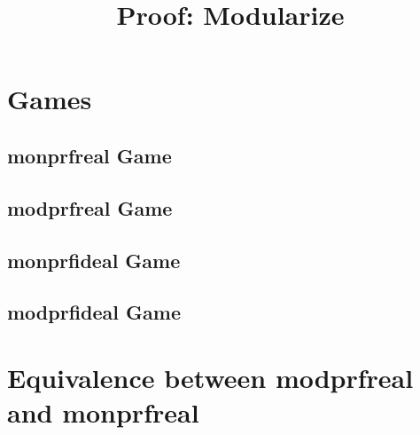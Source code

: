 \documentclass[a4paper,landscape]{article}
\title{Proof: Modularize}
\begin{document}
\maketitle
\section{Games}
\subsection{monprfreal Game}
\begin{center}

\end{center}
\begin{center}

\end{center}
\begin{center}

\end{center}
\subsection{modprfreal Game}
\begin{center}

\end{center}
\begin{center}

\end{center}
\begin{center}

\end{center}
\subsection{monprfideal Game}
\begin{center}

\end{center}
\begin{center}

\end{center}
\begin{center}

\end{center}
\subsection{modprfideal Game}
\begin{center}

\end{center}
\begin{center}

\end{center}
\begin{center}

\end{center}
\section{Equivalence between modprfreal and monprfreal}
\end{document}
